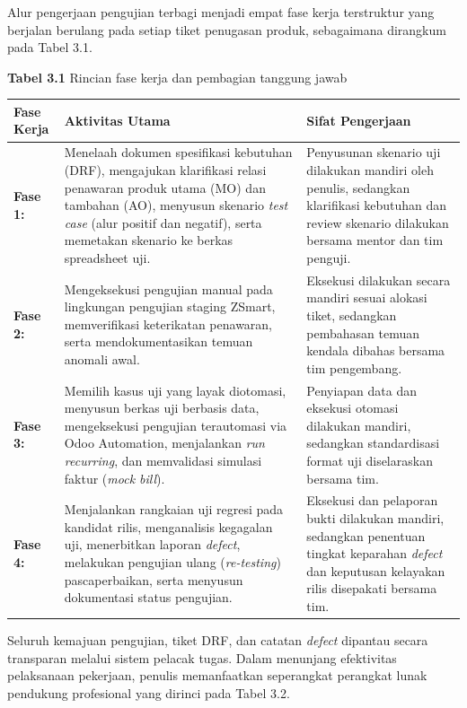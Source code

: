 \documentclass[12pt,a4paper]{article}
\begin{document}
Alur pengerjaan pengujian terbagi menjadi empat fase kerja terstruktur yang berjalan berulang pada setiap tiket penugasan produk, sebagaimana dirangkum pada Tabel 3.1.

\vspace{0.3cm}
\noindent\textbf{Tabel 3.1} Rincian fase kerja dan pembagian tanggung jawab
\vspace{0.1cm}

\noindent
\begin{tabularx}{\textwidth}{|l|X|X|}
\hline
\textbf{Fase Kerja} & \textbf{Aktivitas Utama} & \textbf{Sifat Pengerjaan} \\
\hline
\textbf{Fase 1:} & Menelaah dokumen spesifikasi kebutuhan (DRF), mengajukan klarifikasi relasi penawaran produk utama (MO) dan tambahan (AO), menyusun skenario \textit{test case} (alur positif dan negatif), serta memetakan skenario ke berkas spreadsheet uji. & Penyusunan skenario uji dilakukan mandiri oleh penulis, sedangkan klarifikasi kebutuhan dan review skenario dilakukan bersama mentor dan tim penguji. \\
\hline
\textbf{Fase 2:} & Mengeksekusi pengujian manual pada lingkungan pengujian staging ZSmart, memverifikasi keterikatan penawaran, serta mendokumentasikan temuan anomali awal. & Eksekusi dilakukan secara mandiri sesuai alokasi tiket, sedangkan pembahasan temuan kendala dibahas bersama tim pengembang. \\
\hline
\textbf{Fase 3:} & Memilih kasus uji yang layak diotomasi, menyusun berkas uji berbasis data, mengeksekusi pengujian terautomasi via Odoo Automation, menjalankan \textit{run recurring}, dan memvalidasi simulasi faktur (\textit{mock bill}). & Penyiapan data dan eksekusi otomasi dilakukan mandiri, sedangkan standardisasi format uji diselaraskan bersama tim. \\
\hline
\textbf{Fase 4:} & Menjalankan rangkaian uji regresi pada kandidat rilis, menganalisis kegagalan uji, menerbitkan laporan \textit{defect}, melakukan pengujian ulang (\textit{re-testing}) pascaperbaikan, serta menyusun dokumentasi status pengujian. & Eksekusi dan pelaporan bukti dilakukan mandiri, sedangkan penentuan tingkat keparahan \textit{defect} dan keputusan kelayakan rilis disepakati bersama tim. \\
\hline
\end{tabularx}

\vspace{0.4cm}
Seluruh kemajuan pengujian, tiket DRF, dan catatan \textit{defect} dipantau secara transparan melalui sistem pelacak tugas. Dalam menunjang efektivitas pelaksanaan pekerjaan, penulis memanfaatkan seperangkat perangkat lunak pendukung profesional yang dirinci pada Tabel 3.2.
\end{document}
